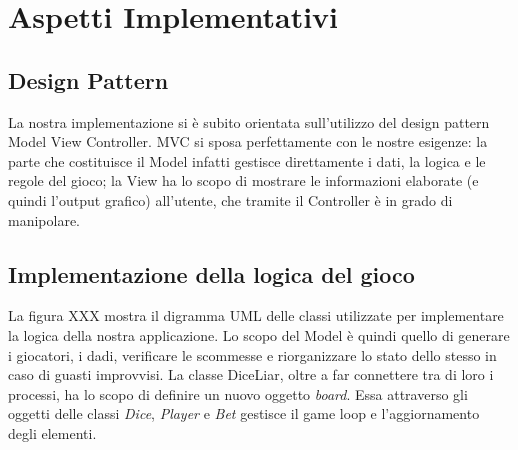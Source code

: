 \documentclass{llncs}
\begin{document}
	\section{Aspetti Implementativi}%
		\subsection{Design Pattern}
			La nostra implementazione si è subito orientata sull'utilizzo del design pattern Model View Controller\cite{MVC}. MVC si sposa perfettamente con le nostre esigenze: la parte che costituisce il Model infatti gestisce direttamente i dati, la logica e le regole del gioco; la View ha lo scopo di mostrare le informazioni elaborate (e quindi l'output grafico) all'utente, che tramite il Controller è in grado di manipolare.
			
		\subsection{Implementazione della logica del gioco}
			La figura XXX mostra il digramma UML delle classi utilizzate per implementare la logica della nostra applicazione. Lo scopo del Model è quindi quello di generare i giocatori, i dadi, verificare le scommesse e riorganizzare lo stato dello stesso in caso di guasti improvvisi. La classe DiceLiar, oltre a far connettere tra di loro i processi, ha lo scopo di definire un nuovo oggetto \textit{board}. Essa attraverso gli oggetti delle classi \textit{Dice}, \textit{Player} e \textit{Bet} gestisce il game loop e l'aggiornamento degli elementi.
			
\end{document}
